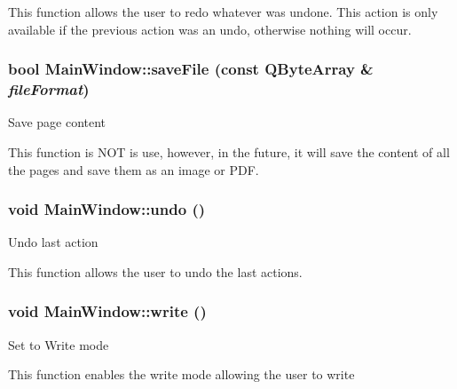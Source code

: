 This function allows the user to redo whatever was undone. This action is only available if the previous action was an undo, otherwise nothing will occur. \hypertarget{classMainWindow_aa115994fe40b4b2d1a746d90f887173e}{
\subsubsection[{saveFile}]{\setlength{\rightskip}{0pt plus 5cm}bool MainWindow::saveFile (const QByteArray \& {\em fileFormat})}}
\label{classMainWindow_aa115994fe40b4b2d1a746d90f887173e}
Save page content

This function is NOT is use, however, in the future, it will save the content of all the pages and save them as an image or PDF. \hypertarget{classMainWindow_a7ed53c4e1d2bf9321ed5df917b55d40a}{
\subsubsection[{undo}]{\setlength{\rightskip}{0pt plus 5cm}void MainWindow::undo ()}}
\label{classMainWindow_a7ed53c4e1d2bf9321ed5df917b55d40a}
Undo last action

This function allows the user to undo the last actions. \hypertarget{classMainWindow_a6fd62e117414acda4fe6a93c453dfb93}{
\subsubsection[{write}]{\setlength{\rightskip}{0pt plus 5cm}void MainWindow::write ()}}
\label{classMainWindow_a6fd62e117414acda4fe6a93c453dfb93}
Set to Write mode

This function enables the write mode allowing the user to write 

